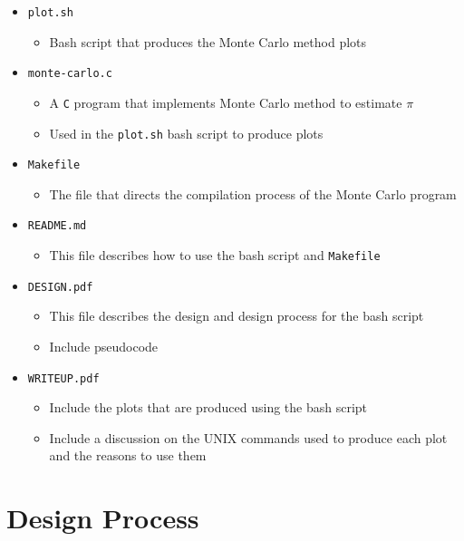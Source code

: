\documentclass[12pt]{article}
\begin{document}
\begin{itemize}
   \item \texttt{plot.sh}
   \begin{itemize}
     \item Bash script that produces the Monte Carlo method plots 
   \end{itemize}
   \item \texttt{monte-carlo.c}
   \begin{itemize}
     \item A \texttt{C} program that implements Monte Carlo method to estimate $\pi$
     \item Used in the \texttt{plot.sh} bash script to produce plots
   \end{itemize}
   \item \texttt{Makefile}
   \begin{itemize}
     \item The file that directs the compilation process of the Monte Carlo program
   \end{itemize}
   \item \texttt{README.md}
   \begin{itemize}
     \item This file describes how to use the bash script and \texttt{Makefile}
   \end{itemize}
   \item \texttt{DESIGN.pdf}
   \begin{itemize}
     \item This file describes the design and design process for the bash script
     \item Include pseudocode
   \end{itemize}
   \item \texttt{WRITEUP.pdf}
   \begin{itemize}
     \item Include the plots that are produced using the bash script
     \item Include a discussion on the UNIX commands used to produce each plot and the reasons to use them
   \end{itemize}
 \end{itemize}

\section{Design Process}
\end{document}
